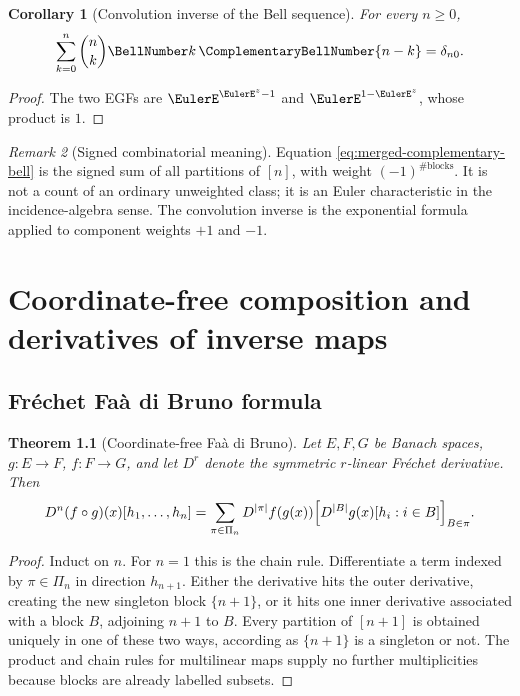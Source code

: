 \documentclass[11pt,a4paper,oneside,openany]{book}
\newtheorem{theorem}{Theorem}[chapter]
\newtheorem{corollary}[theorem]{Corollary}
\theoremstyle{definition}
\theoremstyle{remark}
\newtheorem{remark}[theorem]{Remark}
\begin{document}
\begin{corollary}[Convolution inverse of the Bell sequence]
\label{cor:merged-bell-convolution-inverse}
For every $n\geq0$,
\begin{equation}
 \sum_{k=0}^{n}\binom nk\BellNumber k\,\ComplementaryBellNumber{n-k}=\delta_{n0}.\label{eq:merged-bell-convolution-inverse}
\end{equation}
\end{corollary}

\begin{proof}
The two EGFs are $\EulerE^{\EulerE^z-1}$ and $\EulerE^{1-\EulerE^z}$, whose product is $1$.
\end{proof}

\begin{remark}[Signed combinatorial meaning]
Equation \eqref{eq:merged-complementary-bell} is the signed sum of all
partitions of $[n]$, with weight $(-1)^{\#\text{blocks}}$.  It is not a count
of an ordinary unweighted class; it is an Euler characteristic in the
incidence-algebra sense.  The convolution inverse is the exponential formula
applied to component weights $+1$ and $-1$.
\end{remark}

\chapter{Coordinate-free composition and derivatives of inverse maps}
\label{ch:merged-frechet-inverse}

\section{Fréchet Faà di Bruno formula}

\begin{theorem}[Coordinate-free Faà di Bruno]
\label{thm:merged-frechet-faa}
Let $E,F,G$ be Banach spaces, $g:E\to F$, $f:F\to G$, and let $D^r$ denote
the symmetric $r$-linear Fréchet derivative.  Then
\begin{equation}
 D^n(f\circ g)(x)[h_1,\ldots,h_n]
 =\sum_{\pi\in\Pi_n}D^{|\pi|}f(g(x))
 \Bigl[D^{|B|}g(x)[h_i:i\in B]\Bigr]_{B\in\pi}.                   \label{eq:merged-frechet-faa}
\end{equation}
\end{theorem}

\begin{proof}
Induct on $n$.  For $n=1$ this is the chain rule.  Differentiate a term
indexed by $\pi\in\Pi_n$ in direction $h_{n+1}$.  Either the derivative hits
the outer derivative, creating the new singleton block $\{n+1\}$, or it hits
one inner derivative associated with a block $B$, adjoining $n+1$ to $B$.
Every partition of $[n+1]$ is obtained uniquely in one of these two ways,
according as $\{n+1\}$ is a singleton or not.  The product and chain rules for
multilinear maps supply no further multiplicities because blocks are already
labelled subsets.
\end{proof}
\end{document}
